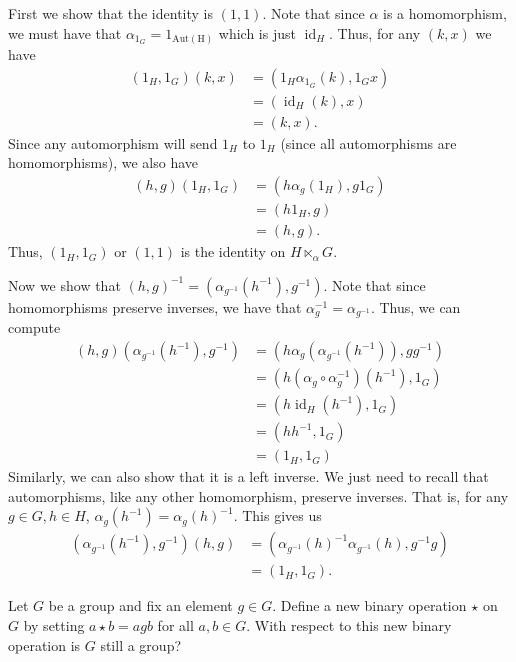 \documentclass[12 pt, letterpaper]{hmcpset}
\begin{document}
\begin{solution}
	First we show that the identity is $(1, 1)$. Note that since $\alpha$ is a homomorphism, we must have that $\alpha_{1_{G}} = 1_{\operatorname{Aut(H)}}$ which is just $\operatorname{id}_{H}$. Thus, for any $(k, x)$ we have
	\[
		\begin{split}
			(1_{H}, 1_{G})(k, x) & = (1_{H} \alpha_{1_{G}}(k), 1_{G}x) \\
				     & = (\operatorname{id}_{H}(k), x) \\
				     & = (k, x).
		\end{split}
	\]
	Since any automorphism will send $1_{H}$ to $1_{H}$ (since all automorphisms are homomorphisms), we also have
	\[
		\begin{split}
			(h, g)(1_{H}, 1_{G}) & = (h \alpha_{g}(1_{H}), g 1_{G}) \\
					     & = (h 1_{H}, g) \\
					     & = (h, g).
		\end{split}
	\]
	Thus, $(1_{H}, 1_{G})$ or $(1, 1)$ is the identity on $H \ltimes_{\alpha} G$. 

	Now we show that $(h, g)^{-1} = (\alpha_{g^{-1}}(h^{-1}), g^{-1})$. Note that since homomorphisms preserve inverses, we have that $\alpha_{g}^{-1} = \alpha_{g^{-1}}$. Thus, we can compute
	\[
		\begin{split}
			(h, g)(\alpha_{g^{-1}}(h^{-1}), g^{-1}) & = (h \alpha_{g}(\alpha_{g^{-1}}(h^{-1})), g g^{-1}) \\
								& = (h (\alpha_{g} \circ \alpha_{g}^{-1})(h^{-1}), 1_{G}) \\
								& = (h \operatorname{id}_{H}(h^{-1}), 1_{G}) \\
								& = (h h^{-1}, 1_{G}) \\
								& = (1_{H}, 1_{G})
		\end{split}
	\]
	Similarly, we can also show that it is a left inverse. We just need to recall that automorphisms, like any other homomorphism, preserve inverses. That is, for any $g \in G, h \in H$, $\alpha_{g}(h^{-1}) = \alpha_{g}(h)^{-1}$. This gives us
	\[
		\begin{split}
			(\alpha_{g^{-1}}(h^{-1}), g^{-1})(h, g) & = (\alpha_{g^{-1}}(h)^{-1} \alpha_{g^{-1}}(h), g^{-1} g) \\
								& = (1_{H}, 1_{G}).
		\end{split}
	\]
\end{solution}

\pagebreak

\begin{problem}[2.]
	Let $G$ be a group and fix an element $g \in G$. Define a new binary operation $\star$ on $G$ by setting $a \star b = agb$ for all $a, b \in G$. With respect to this new binary operation is $G$ still a group?
\end{problem}
\end{document}
